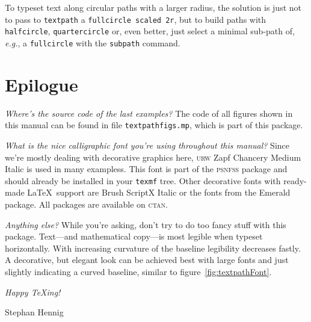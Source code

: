 \documentclass{article}
\newcommand*{\cmd}[1]{\texttt{#1}}
\newcommand{\user}[1]{\emph{#1}}
\begin{document}
To typeset text along circular paths with a larger radius, the solution is just not to pass to \cmd{textpath} a \cmd{fullcircle scaled 2r}, but to build paths with \cmd{halfcircle}, \cmd{quartercircle} or, even better, just select a minimal sub-path of, \emph{e.g.}, a \cmd{fullcircle} with the \cmd{subpath} command.



\section{Epilogue}
\user{Where's the source code of the last examples?}  The code of all figures shown in this manual can be found in file \cmd{textpathfigs.mp}, which is part of this package.

\user{What is the nice calligraphic font you're using throughout this manual?}  Since we're mostly dealing with decorative graphics here, \textsc{urw} Zapf Chancery Medium Italic is used in many exampless.  This font is part of the \textsc{psnfss} package and should already be installed in your \cmd{texmf} tree.  Other decorative fonts with ready-made \LaTeX\ support are Brush ScriptX Italic or the fonts from the Emerald package.  All packages are available on \textsc{ctan}.

\user{Anything else?} While you're asking, don't try to do too fancy stuff with this package.  Text---and mathematical copy---is most legible when typeset horizontally.  With increasing curvature of the baseline legibility decreases fastly.  A decorative, but elegant look can be achieved best with large fonts and just slightly indicating a curved baseline, similar to figure~\ref{fig:textpathFont}.

\bigskip
\raggedright\itshape
Happy \TeX ing!\par
Stephan Hennig
\end{document}
